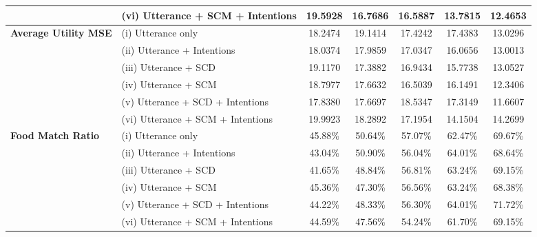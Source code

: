 \begin{table*}[ht]
\begin{tabular}{llccccc}
 & (vi) Utterance + SCM + Intentions & \cellcolor{red!25}19.5928 & \cellcolor{green!25}16.7686 & \cellcolor{green!25}16.5887 & \cellcolor{green!25}13.7815 & \cellcolor{red!25}12.4653 \\
\midrule
\multirow{6}{*}{\textbf{Average Utility MSE}} & (i) Utterance only & 18.2474 & 19.1414 & 17.4242 & 17.4383 & 13.0296 \\
 & (ii) Utterance + Intentions & \cellcolor{green!25}18.0374 & \cellcolor{green!25}17.9859 & \cellcolor{green!25}17.0347 & \cellcolor{green!25}16.0656 & \cellcolor{green!25}13.0013 \\
 & (iii) Utterance + SCD & \cellcolor{red!25}19.1170 & \cellcolor{green!25}17.3882 & \cellcolor{green!25}16.9434 & \cellcolor{green!25}15.7738 & \cellcolor{red!25}13.0527 \\
 & (iv) Utterance + SCM & \cellcolor{red!25}18.7977 & \cellcolor{green!25}17.6632 & \cellcolor{green!25}16.5039 & \cellcolor{green!25}16.1491 & \cellcolor{green!25}12.3406 \\
 & (v) Utterance + SCD + Intentions & \cellcolor{green!25}17.8380 & \cellcolor{green!25}17.6697 & \cellcolor{red!25}18.5347 & \cellcolor{green!25}17.3149 & \cellcolor{green!25}11.6607 \\
 & (vi) Utterance + SCM + Intentions & \cellcolor{red!25}19.9923 & \cellcolor{green!25}18.2892 & \cellcolor{green!25}17.1954 & \cellcolor{green!25}14.1504 & \cellcolor{red!25}14.2699 \\
\midrule
\multirow{6}{*}{\textbf{Food Match Ratio}} & (i) Utterance only & 45.88\% & 50.64\% & 57.07\% & 62.47\% & 69.67\% \\
 & (ii) Utterance + Intentions & \cellcolor{red!25}43.04\% & \cellcolor{green!25}50.90\% & \cellcolor{red!25}56.04\% & \cellcolor{green!25}64.01\% & \cellcolor{red!25}68.64\% \\
 & (iii) Utterance + SCD & \cellcolor{red!25}41.65\% & \cellcolor{red!25}48.84\% & \cellcolor{red!25}56.81\% & \cellcolor{green!25}63.24\% & \cellcolor{red!25}69.15\% \\
 & (iv) Utterance + SCM & \cellcolor{red!25}45.36\% & \cellcolor{red!25}47.30\% & \cellcolor{red!25}56.56\% & \cellcolor{green!25}63.24\% & \cellcolor{red!25}68.38\% \\
 & (v) Utterance + SCD + Intentions & \cellcolor{red!25}44.22\% & \cellcolor{red!25}48.33\% & \cellcolor{red!25}56.30\% & \cellcolor{green!25}64.01\% & \cellcolor{green!25}71.72\% \\
 & (vi) Utterance + SCM + Intentions & \cellcolor{red!25}44.59\% & \cellcolor{red!25}47.56\% & \cellcolor{red!25}54.24\% & \cellcolor{red!25}61.70\% & \cellcolor{red!25}69.15\% \\

\end{tabular}
\end{table*}
